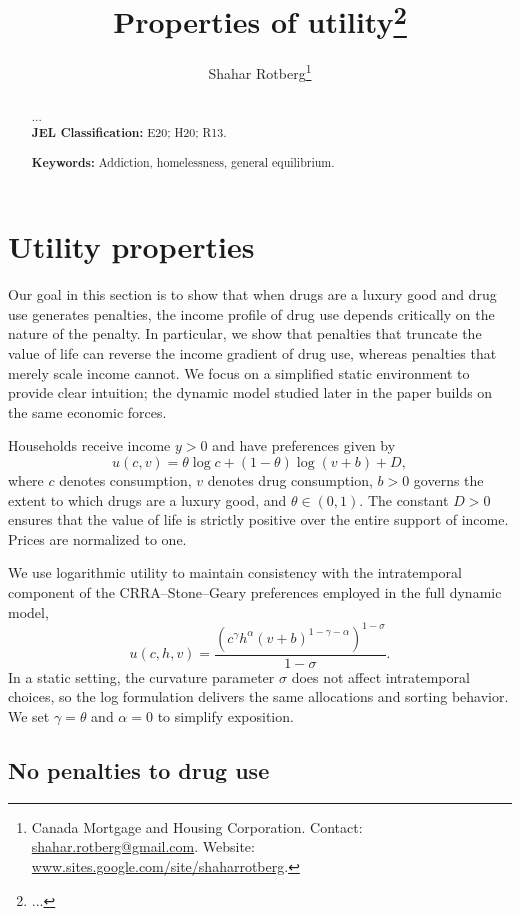 \documentclass[parskip=full]{article}
\title{\vspace{-1.8cm}Properties of utility\footnote{...}}
\author{Shahar Rotberg\footnote{Canada Mortgage and Housing Corporation. Contact: \url{shahar.rotberg@gmail.com}. Website: \url{www.sites.google.com/site/shaharrotberg}.}}
\theoremstyle{plain}      %
\theoremstyle{remark}    %
\begin{document}
\maketitle

\begin{abstract}
\onehalfspacing
\noindent

\noindent ...
\\[1.5ex]

\noindent \textbf{JEL Classification:} E20; H20; R13. 

\noindent \textbf{Keywords:} Addiction, homelessness, general equilibrium.
\end{abstract}
\section{Utility properties}

Our goal in this section is to show that when drugs are a luxury good and drug use generates penalties, the income profile of drug use depends critically on the nature of the penalty. In particular, we show that penalties that truncate the value of life can reverse the income gradient of drug use, whereas penalties that merely scale income cannot. We focus on a simplified static environment to provide clear intuition; the dynamic model studied later in the paper builds on the same economic forces.

Households receive income $y>0$ and have preferences given by
\[u(c,v) = \theta \log c + (1-\theta)\log(v+b) + D,\]
where $c$ denotes consumption, $v$ denotes drug consumption, $b>0$ governs the extent to which drugs are a luxury good, and $\theta\in(0,1)$. The constant $D>0$ ensures that the value of life is strictly positive over the entire support of income. Prices are normalized to one.

We use logarithmic utility to maintain consistency with the intratemporal component of the CRRA–Stone--Geary preferences employed in the full dynamic model,
\[u(c,h,v)=\frac{\left(c^{\gamma} h^{\alpha} (v+b)^{1-\gamma-\alpha}\right)^{1-\sigma}}{1-\sigma}.\]
In a static setting, the curvature parameter $\sigma$ does not affect intratemporal choices, so the log formulation delivers the same allocations and sorting behavior. We set $\gamma=\theta$ and $\alpha=0$ to simplify exposition.

\subsection{No penalties to drug use}
\end{document}
